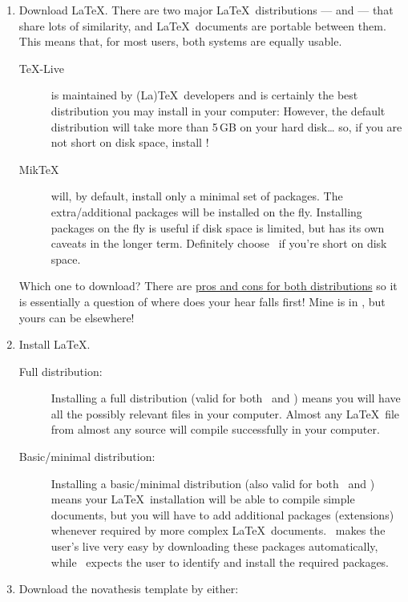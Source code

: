 \begin{enumerate}
  \item Download \LaTeX.  There are two major \LaTeX\ distributions — \href{https://miktex.org/}{\MikTeX} and \href{https://www.tug.org/texlive/}{\TeXLive} — that share lots of similarity, and \LaTeX\ documents are portable between them. This means that, for most users, both systems are equally usable.
  \begin{description}
    \item [\TeX-Live] is maintained by (La)\TeX\ developers and is certainly the best distribution you may install in your computer:  However, the default distribution will take more than 5\,GB on your hard disk… so, if you are not short on disk space, install \TeXLive!
    \item[Mik\TeX] will, by default, install only a minimal set of packages. The extra/additional packages will be installed on the fly.  Installing packages on the fly is useful if disk space is limited, but has its own caveats in the longer term.  Definitely choose \MikTeX\ if you're short on disk space.
  \end{description}
  Which one to download?  There are \href{https://tex.stackexchange.com/questions/20036/what-are-the-advantages-of-tex-live-over-miktex}{pros and cons for both distributions} so it is essentially a question of where does your hear falls first!  Mine is in \TeXLive, but yours can be elsewhere!  \emojiSmile
  \item Install \LaTeX.
  \begin{description}
    \item [Full distribution:] Installing a full distribution (valid for both \TeXLive\ and \MikTeX) means you will have all the possibly relevant files in your computer.  Almost any \LaTeX\ file from almost any source will compile successfully in your computer.
    \item [Basic/minimal distribution:] Installing a basic/minimal distribution (also valid for both \TeXLive\ and \MikTeX) means your \LaTeX\ installation will be able to compile simple documents, but you will have to add additional packages (extensions) whenever required by more complex \LaTeX\ documents.  \MikTeX\ makes the user's live very easy by downloading these packages automatically, while \TeXLive\ expects the user to identify and install the required packages.
  \end{description}
  \item Download the \gls{novathesis} template by either:
  \begin{itemize}

\end{itemize}
\end{enumerate}

